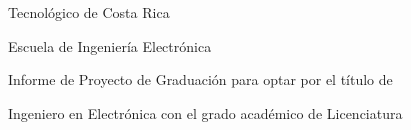 
\thispagestyle{empty} 

\begin{center}

Tecnológico de Costa Rica

\par\vspace{1ex}

Escuela de Ingeniería Electrónica

\par\vspace{20mm}


\par\vspace*{\fill}

{\large\bf{\scriptTitle}}

\par\vspace*{\fill}

Informe de Proyecto de Graduación para optar por el título de

Ingeniero en Electrónica con el grado académico de Licenciatura

\par\vspace{20mm}

\scriptAuthor

\vspace*{\fill}

\end{center}
\newpage 
\cleardoublepage 


